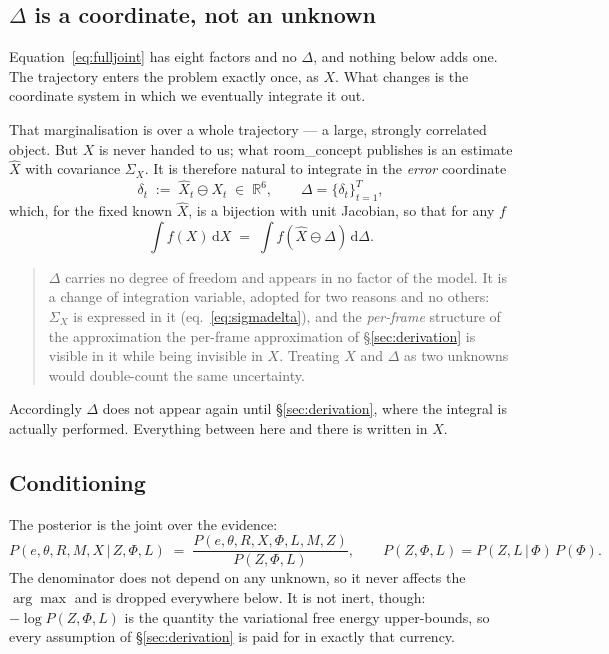\documentclass[11pt,a4paper]{report}
\newcommand{\given}{\,|\,}
\newcommand{\R}{\mathbb{R}}
\theoremstyle{definition}   %
\begin{document}
\subsection{$\Delta$ is a coordinate, not an unknown}
\label{sec:deltaisx}

Equation~\eqref{eq:fulljoint} has eight factors and no $\Delta$, and nothing below adds one. The
trajectory enters the problem exactly once, as $X$. What changes is the coordinate system in
which we eventually integrate it out.

That marginalisation is over a whole trajectory --- a large, strongly correlated object. But $X$
is never handed to us; what \textsf{room\_concept} publishes is an estimate $\hat X$ with
covariance $\Sigma_X$. It is therefore natural to integrate in the \emph{error} coordinate
\begin{equation}
\delta_t \;:=\; \hat X_t \ominus X_t \;\in\;\R^{6},
\qquad \Delta=\{\delta_t\}_{t=1}^{T},
\label{eq:deltadef}
\end{equation}
which, for the fixed known $\hat X$, is a bijection with unit Jacobian, so that for any $f$
\begin{equation}
\int f(X)\,\mathrm{d}X \;=\; \int f\!\left(\hat X\ominus\Delta\right)\,\mathrm{d}\Delta .
\label{eq:changeofvar}
\end{equation}

\begin{quote}
$\Delta$ carries no degree of freedom and appears in no factor of the model. It is a change of
integration variable, adopted for two reasons and no others: $\Sigma_X$ is expressed in it
(eq.~\ref{eq:sigmadelta}), and the \emph{per-frame} structure of the approximation
the per-frame approximation of \S\ref{sec:derivation} is visible in it while being invisible in
$X$. Treating $X$ and $\Delta$ as two
unknowns would double-count the same uncertainty.
\end{quote}

\noindent
Accordingly $\Delta$ does not appear again until \S\ref{sec:derivation}, where the integral is
actually performed. Everything between here and there is written in $X$.

\subsection{Conditioning}

The posterior is the joint over the evidence:
\begin{equation}
P\!\left(e,\theta,R,M,X\given Z,\Phi,L\right)
\;=\;
\frac{P\!\left(e,\theta,R,X,\Phi,L,M,Z\right)}{P(Z,\Phi,L)},
\qquad
P(Z,\Phi,L)=P(Z,L\given\Phi)\,P(\Phi).
\label{eq:conditioning}
\end{equation}
The denominator does not depend on any unknown, so it never affects the $\arg\max$ and is dropped
everywhere below. It is not inert, though: $-\log P(Z,\Phi,L)$ is the quantity the variational free
energy upper-bounds, so every assumption of \S\ref{sec:derivation} is paid for in exactly that
currency.
\end{document}
